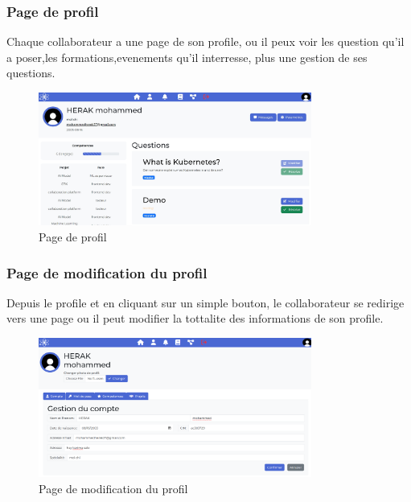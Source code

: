 \documentclass{article}
\begin{document}
            \subsubsection{Page de profil}
                Chaque collaborateur a une page de son profile, ou il peux voir les question qu'il a poser,les formations,evenements qu'il interresse, plus une gestion de ses questions.
                \begin{figure}[h!]
                    \centering
                    \includegraphics[width=0.8\textwidth]{assets/webSite/profielPage.jpeg}
                    \caption{Page de profil}
                \end{figure}
                \FloatBarrier
            \subsubsection{Page de modification du profil}
                Depuis le profile et en cliquant sur un simple bouton, le collaborateur se redirige vers une page ou il peut modifier la tottalite des informations de son profile.
                \begin{figure}[h!]
                    \centering
                    \includegraphics[width=0.8\textwidth]{assets/webSite/modifProfile.png}
                    \caption{Page de modification du profil}
                \end{figure}
                \FloatBarrier
\end{document}
